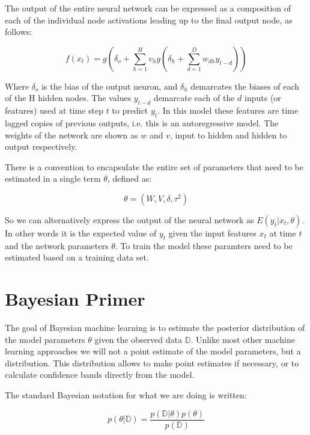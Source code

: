 \documentclass[12pt,a4paper]{article}
\numberwithin{equation}{section}
\begin{document}
The output of the entire neural network can be expressed as a composition of each of the individual 
node activations leading up to the final output node, as follows:

\begin{equation}
\label{eq:network}
f(x_t) = g( \delta_o + \sum_{h=1}^H v_h g(\delta_h + \sum_{d=1}^D w_{dh} y_{t-d} ) )
\end{equation}

Where $\delta_o$ is the bias of the output neuron, and $\delta_h$ demarcates the biases
of each of the H hidden nodes. The values $y_{t-d}$ demarcate each of the $d$ inputs 
(or features) used at time step $t$ to predict $y_t$. In this model these features are
time lagged copies of previous outputs, i.e. this is an autoregressive model.
The weights of the network are shown as $w$ and $v$, input to hidden and hidden to output respectively. 

There is a convention to encapsulate the entire set of parameters that need to be estimated 
in a single term $\theta$, defined as:
 
\begin{equation}
\theta = (W, V, \delta, \tau^2)
\end{equation}

So we can alternatively express the output of the neural network as $E(y_t | x_t, \theta)$.
In other words it is the expected value of $y_t$ given the input features $x_t$ at time $t$ 
and the network parameters $\theta$.
To train the model these paramters need to be estimated based on a training data set.


\section{Bayesian Primer}

The goal of Bayesian machine learning is to estimate the posterior distribution of the 
model parameters $\theta$ given the observed data $\mathbb{D}$. Unlike most other machine
learning approaches we will not a point estimate of the model parameters, but a distribution.
This distribution allows to make point estimates if necessary, or to calculate confidence bands
directly from the model.

The standard Bayesian notation for what we are doing is written:

\begin{equation}
\label{eq:posterior}
p(\theta | \mathbb{D}) = \frac{ p(\mathbb{D} | \theta) p(\theta) }{ p(\mathbb{D}) }
\end{equation}
\end{document}
